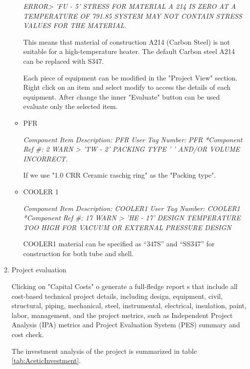 \begin{enumerate}[label=\textbf{Step \arabic{enumi}}:,ref=Step \arabic{enumi}]
\begin{itemize}
		\textit{ERROR> 'FU -    5' STRESS FOR MATERIAL A 214   IS ZERO AT A TEMPERATURE OF  791.85 SYSTEM MAY NOT CONTAIN STRESS VALUES FOR THE MATERIAL.}
		
		This means that material of construction A214 (Carbon Steel) is not suitable for a high-temperature heater. The default Carbon steel A214 can be replaced with S347.
		
		Each piece of equipment can be modified in the "Project View" section. Right click on an item and select modify to access the details of each equipment. After change the inner "Evaluate" button can be used evaluate only the selected item. \\
		
		\item PFR
		
		\textit{Component Item Description: PFR
			User Tag Number: PFR
			*Component Ref \#: 2
			WARN > 'TW -    2' PACKING TYPE '      ' AND/OR VOLUME INCORRECT.}
		
		If we use "1.0 CRR Ceramic raschig ring" as the "Packing type". \\
		
		\item COOLER 1
		
		\textit{Component Item Description: COOLER1
			User Tag Number: COOLER1
			*Component Ref \#: 17
			WARN > 'HE -   17' DESIGN TEMPERATURE TOO HIGH FOR VACUUM OR EXTERNAL PRESSURE DESIGN}
		
		COOLER1 material can be specified as “347S” and “SS347” for construction for both tube and shell.
		
	\end{itemize}
	
	\item Project evaluation \label{ste:ProjectEvaluation}
	
	Clicking on "Capital Costs" o generate a full-fledge report s that include all cost-based technical project details, including design, equipment, civil, structural, piping, mechanical, steel, instrumental, electrical, insulation, paint, labor, management, and the project metrics, such as Independent Project Analysis (IPA) metrics and Project Evaluation System (PES) summary and cost check. 
	
	The investment analysis of the project is summarized in table \ref{tab:AceticInvestment}.
	

\end{enumerate}
